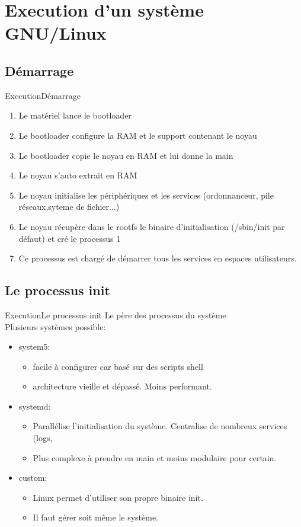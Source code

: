 \section{Execution d'un système GNU/Linux}

\subsection{Démarrage}
\begin{frame}{Execution}{Démarrage}
	\begin{enumerate}
		\item
			Le matériel lance le bootloader
		\item
			Le bootloader configure la RAM et le support contenant le noyau 
		\item
			Le bootloader copie le noyau en RAM et lui donne la main
		\item
			Le noyau s'auto extrait en RAM
		\item
			Le noyau initialise les périphériques et les services (ordonnanceur, pile réseaux,syteme de fichier...)
		\item
			Le noyau récupère dans le rootfs le binaire d'initialisation (/sbin/init par défaut) et cré le processus 1
		\item
			Ce processus est chargé de démarrer tous les services en espaces utilisateurs.
	\end{enumerate}
\end{frame}

\subsection{Le processus init}
\begin{frame}{Execution}{Le processus init}
	Le père des processus du système\\
	Plusieurs systèmes possible:
	\begin{itemize}
		\item
			system5: 
			\begin{itemize}
				\item
					facile à configurer car basé sur des scripts shell
				\item
					architecture vieille et dépassé. Moins performant.
			\end{itemize}
		\item
			systemd:
		\begin{itemize}
			\item
				Parallélise l'initialisation du système. Centralise de nombreux services (logs,
			\item
				Plus complexe à prendre en main et moins modulaire pour certain.
		\end{itemize}
		\item
			custom:
			\begin{itemize}
				\item
					Linux permet d'utiliser son propre binaire init.
				\item
					Il faut gérer soit même le système.
			\end{itemize}	
	\end{itemize}
\end{frame}
